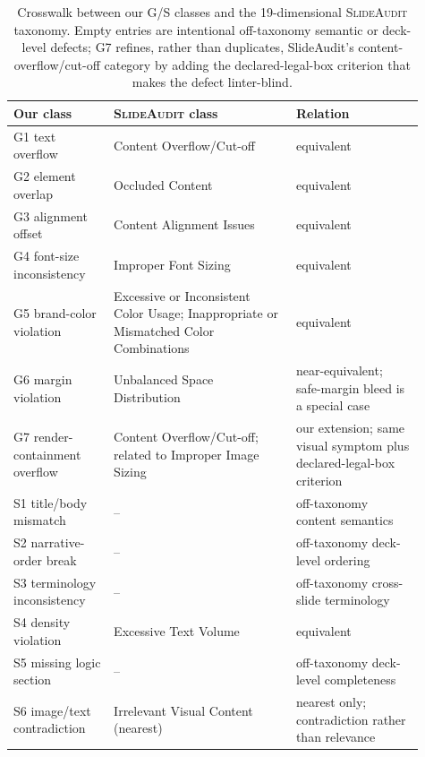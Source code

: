 \documentclass[10pt]{article}
\newcommand{\g}[1]{\textsf{#1}}        %
\begin{document}
\begin{table}[t]
\centering
\footnotesize
\setlength{\tabcolsep}{3pt}
\caption{Crosswalk between our G/S classes and the 19-dimensional \textsc{SlideAudit} taxonomy. Empty entries are
intentional off-taxonomy semantic or deck-level defects; \g{G7} refines, rather than duplicates, SlideAudit's
content-overflow/cut-off category by adding the declared-legal-box criterion that makes the defect linter-blind.}
\label{tab:slideaudit-crosswalk}
\begin{tabular}{@{}p{0.22\linewidth}p{0.40\linewidth}p{0.29\linewidth}@{}}
\toprule
Our class & \textsc{SlideAudit} class & Relation \\
\midrule
\g{G1} text overflow & Content Overflow/Cut-off & equivalent \\
\g{G2} element overlap & Occluded Content & equivalent \\
\g{G3} alignment offset & Content Alignment Issues & equivalent \\
\g{G4} font-size inconsistency & Improper Font Sizing & equivalent \\
\g{G5} brand-color violation & Excessive or Inconsistent Color Usage; Inappropriate or Mismatched Color Combinations & equivalent \\
\g{G6} margin violation & Unbalanced Space Distribution & near-equivalent; safe-margin bleed is a special case \\
\g{G7} render-containment overflow & Content Overflow/Cut-off; related to Improper Image Sizing & our extension; same visual symptom plus declared-legal-box criterion \\
\g{S1} title/body mismatch & -- & off-taxonomy content semantics \\
\g{S2} narrative-order break & -- & off-taxonomy deck-level ordering \\
\g{S3} terminology inconsistency & -- & off-taxonomy cross-slide terminology \\
\g{S4} density violation & Excessive Text Volume & equivalent \\
\g{S5} missing logic section & -- & off-taxonomy deck-level completeness \\
\g{S6} image/text contradiction & Irrelevant Visual Content (nearest) & nearest only; contradiction rather than relevance \\
\bottomrule
\end{tabular}
\end{table}

\end{document}
